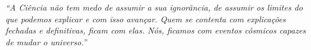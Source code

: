 \begin{epigrafe}
    \vspace*{\fill}
	\begin{flushright}
		\textit{``A Ciência não tem medo de assumir a sua ignorância, de assumir os limites do que podemos explicar e com isso avançar. Quem se contenta com explicações fechadas e definitivas, ficam com elas. Nós, ficamos com eventos cósmicos capazes de mudar o universo.'' \\}
	\end{flushright}
\end{epigrafe}

